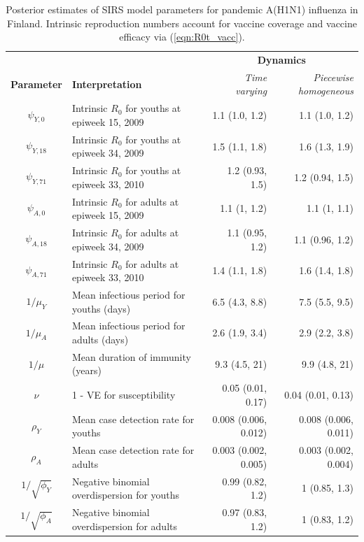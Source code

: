 \begin{table}
	\caption[Posterior estimates of SIRS model parameters for pandemic A(H1N1) influenza in Finland.]{Posterior estimates of SIRS model parameters for pandemic A(H1N1) influenza in Finland. Intrinsic reproduction numbers account for vaccine coverage and vaccine efficacy via (\ref{eqn:R0t_vacc}).} 
	\label{tab:flu_param_ests}
	\centering\footnotesize
	\begin{tabular}{clrr}
		\hline
		&&\multicolumn{2}{c}{\textbf{Dynamics}}\\
		\cmidrule{3-4}\textbf{Parameter} & \textbf{Interpretation} & \textit{Time varying} & \textit{Piecewise homogeneous}\\
		\hline
		$ \psi_{Y,0} $ & Intrinsic $ R_0 $ for youths at epiweek 15, 2009  & 1.1 (1.0, 1.2) & 1.1 (1.0, 1.2)\\
		$ \psi_{Y,18} $ & Intrinsic $ R_0 $ for youths at epiweek 34, 2009 & 1.5 (1.1, 1.8) & 1.6 (1.3, 1.9)\\
		$ \psi_{Y,71} $ & Intrinsic $ R_0 $ for youths at epiweek 33, 2010 & 1.2 (0.93, 1.5) & 1.2 (0.94, 1.5)\\
		$ \psi_{A,0} $ & Intrinsic $ R_0 $ for adults at epiweek 15, 2009  & 1.1 (1, 1.2) & 1.1 (1, 1.1)\\
		$ \psi_{A,18} $ & Intrinsic $ R_0 $ for adults at epiweek 34, 2009 & 1.1 (0.95, 1.2) & 1.1 (0.96, 1.2)\\
		$ \psi_{A,71} $ & Intrinsic $ R_0 $ for adults at epiweek 33, 2010 & 1.4 (1.1, 1.8) & 1.6 (1.4, 1.8)\\
		$ 1/\mu_{Y} $ & Mean infectious period for youths (days) & 6.5 (4.3, 8.8) & 7.5 (5.5, 9.5)\\
		$ 1/\mu_A $ & Mean infectious period for adults (days) & 2.6 (1.9, 3.4) & 2.9 (2.2, 3.8)\\
		$ 1/\mu $ & Mean duration of immunity (years) & 9.3 (4.5, 21) & 9.9 (4.8, 21)\\
		$ \nu $ & 1 - VE for susceptibility & 0.05 (0.01, 0.17) & 0.04 (0.01, 0.13)\\
		$ \rho_Y $ & Mean case detection rate for youths & 0.008 (0.006, 0.012) & 0.008 (0.006, 0.011)\\
		$ \rho_A $ & Mean case detection rate for adults & 0.003 (0.002, 0.005) & 0.003 (0.002, 0.004)\\		
		$ 1/\sqrt{\phi_Y} $ & Negative binomial overdispersion for youths & 0.99 (0.82, 1.2) & 1 (0.85, 1.3)\\
		$ 1/\sqrt{\phi_A} $ & Negative binomial overdispersion for adults & 0.97 (0.83, 1.2) & 1 (0.83, 1.2)\\
		\hline
	\end{tabular}
\end{table}

